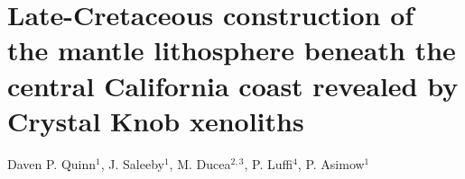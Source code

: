 \chapter{Late-Cretaceous construction of the mantle lithosphere beneath
the central California coast revealed by Crystal Knob xenoliths}
Daven P. Quinn$^1$, J. Saleeby$^1$, M. Ducea$^{2,3}$, P. Luffi$^4$, P. Asimow$^1$






